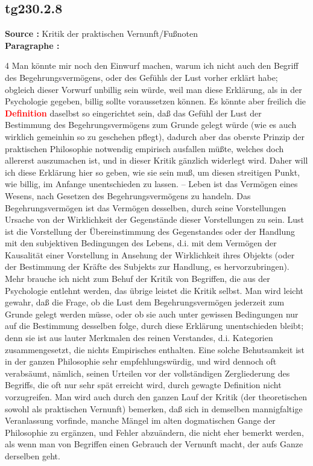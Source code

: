 \documentclass[a4paper,12pt,twoside]{book}
\newcommand{\match}[1]{\textcolor{red}{\textbf{#1}}}
\begin{document}
	\subsection*{tg230.2.8} 
	\textbf{Source : }Kritik der praktischen Vernunft/Fußnoten\\  
	
	\noindent\textbf{Paragraphe : }
	
	4 Man könnte mir noch den Einwurf machen, warum ich nicht auch den Begriff des Begehrungsvermögens, oder des Gefühls der Lust vorher erklärt habe; obgleich dieser Vorwurf unbillig sein würde, weil man diese Erklärung, als in der Psychologie gegeben, billig sollte voraussetzen können. Es könnte aber freilich die \match{Definition} daselbst so eingerichtet sein, daß das Gefühl der Lust der Bestimmung des Begehrungsvermögens zum Grunde gelegt würde (wie es auch wirklich gemeinhin so zu geschehen pflegt), dadurch aber das oberste Prinzip der praktischen Philosophie notwendig empirisch ausfallen müßte, welches doch allererst auszumachen ist, und in dieser Kritik gänzlich widerlegt wird. Daher will ich diese Erklärung hier so geben, wie sie sein muß, um diesen streitigen Punkt, wie billig, im Anfange unentschieden zu lassen. – Leben ist das Vermögen eines Wesens, nach Gesetzen des Begehrungsvermögens zu handeln. Das Begehrungsvermögen ist das Vermögen desselben, durch seine Vorstellungen Ursache von der Wirklichkeit der Gegenstände dieser Vorstellungen zu sein. Lust ist die Vorstellung der Übereinstimmung des Gegenstandes oder der Handlung mit den subjektiven Bedingungen des Lebens, d.i. mit dem Vermögen der Kausalität einer Vorstellung in Ansehung der Wirklichkeit ihres Objekts (oder der Bestimmung der Kräfte des Subjekts zur Handlung, es hervorzubringen). Mehr brauche ich nicht zum Behuf der Kritik von Begriffen, die aus der Psychologie entlehnt werden, das übrige leistet die Kritik selbst. Man wird leicht gewahr, daß die Frage, ob die Lust dem Begehrungsvermögen jederzeit zum Grunde gelegt werden müsse, oder ob sie auch unter gewissen Bedingungen nur auf die Bestimmung desselben folge, durch diese Erklärung unentschieden bleibt; denn sie ist aus lauter Merkmalen des reinen Verstandes, d.i. Kategorien zusammengesetzt, die nichts Empirisches enthalten. Eine solche Behutsamkeit ist in der ganzen Philosophie sehr empfehlungswürdig, und wird dennoch oft verabsäumt, nämlich, seinen Urteilen vor der vollständigen Zergliederung des Begriffs, die oft nur sehr spät erreicht wird, durch gewagte Definition nicht vorzugreifen. Man wird auch durch den ganzen Lauf der Kritik (der theoretischen sowohl als praktischen Vernunft) bemerken, daß sich in demselben mannigfaltige Veranlassung vorfinde, manche Mängel im alten dogmatischen Gange der Philosophie zu ergänzen, und Fehler abzuändern, die nicht eher bemerkt werden, als wenn man von Begriffen einen Gebrauch der Vernunft macht, der aufs Ganze derselben geht. 
	
\end{document}
